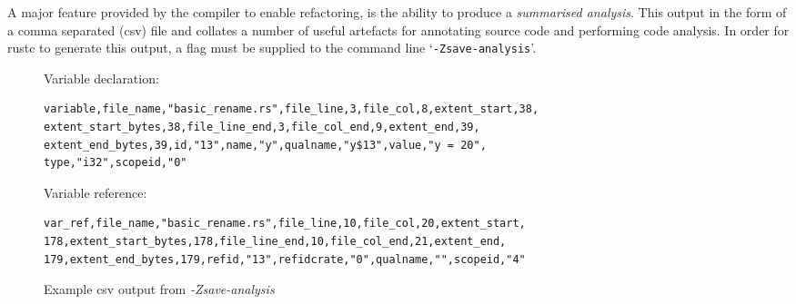 %

A major feature provided by the compiler to enable refactoring, is the ability to produce a \textit{summarised analysis}. This output in the form of a comma separated (csv) file and collates a number of useful artefacts for annotating source code and performing code analysis. In order for rustc to generate this output, a flag must be supplied to the command line `{\verb|-Zsave-analysis|}'.


\begin{figure*}
\vspace{5mm}
\noindent
Variable declaration:
\begin{verbatim}
variable,file_name,"basic_rename.rs",file_line,3,file_col,8,extent_start,38,
extent_start_bytes,38,file_line_end,3,file_col_end,9,extent_end,39,
extent_end_bytes,39,id,"13",name,"y",qualname,"y$13",value,"y = 20",
type,"i32",scopeid,"0"
\end{verbatim}

\noindent
Variable reference:
\begin{verbatim}
var_ref,file_name,"basic_rename.rs",file_line,10,file_col,20,extent_start,
178,extent_start_bytes,178,file_line_end,10,file_col_end,21,extent_end,
179,extent_end_bytes,179,refid,"13",refidcrate,"0",qualname,"",scopeid,"4"
\end{verbatim}

\caption{Example csv output from \emph{-Zsave-analysis}}
\label{Fig:csv}
\end{figure*}


